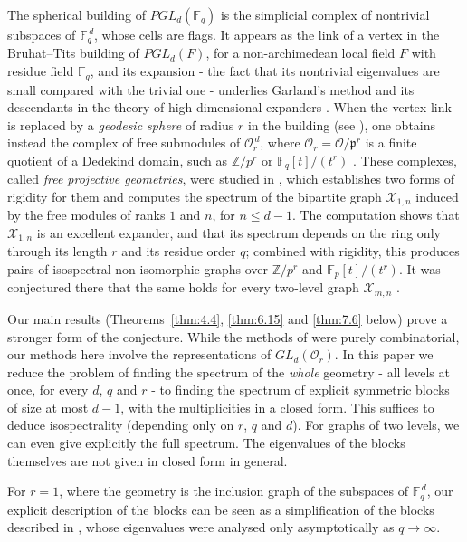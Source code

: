 \documentclass[11pt]{article}
\numberwithin{equation}{section}
\theoremstyle{plain}
\theoremstyle{definition}
\begin{document}
The spherical building of $PGL_d(\mathbb{F}_q)$ is the simplicial complex of
nontrivial subspaces of $\mathbb{F}_q^{\,d}$, whose cells are flags. It appears as the
link of a vertex in the Bruhat--Tits building of $PGL_d(F)$, for a
non-archimedean local field $F$ with residue field $\mathbb{F}_q$, and its
expansion - the fact that its nontrivial eigenvalues are small compared with the
trivial one - underlies Garland's method and its descendants in the theory of
high-dimensional expanders \cite{Gar73,Opp18}. When the vertex link is replaced by
a \emph{geodesic sphere} of radius $r$ in the building (see \cite{KP22}), one obtains instead the complex of
free submodules of $\mathcal{O}_r^{\,d}$, where $\mathcal{O}_r=\mathcal{O}/\mathfrak{p}^r$
is a finite quotient of a Dedekind domain, such as $\mathbb{Z}/p^r$ or
$\mathbb{F}_q[t]/(t^r)$ \cite{KP22}. These complexes, called \emph{free projective
geometries}, were studied in \cite{LP25}, which establishes two forms of rigidity for them and
computes the spectrum of the bipartite graph $\mathcal{X}_{1,n}$ induced by the free
modules of ranks $1$ and $n$, for $n\le d-1$. The computation shows that $\mathcal{X}_{1,n}$ is an
excellent expander, and that its spectrum depends on the ring only through its length
$r$ and its residue order $q$; combined with rigidity, this produces pairs of isospectral
non-isomorphic graphs over $\mathbb{Z}/p^r$ and $\mathbb{F}_p[t]/(t^r)$. It was
conjectured there that the same holds for every two-level graph $\mathcal{X}_{m,n}$
\cite[Conj. 6.2]{LP25}.

Our main results (Theorems~\ref{thm:4.4}, \ref{thm:6.15} and \ref{thm:7.6} below) prove a
stronger form of the conjecture. While the methods of \cite{LP25} were purely combinatorial,
our methods here involve the representations of $GL_d(\mathcal{O}_r)$.
In this paper we reduce the problem of finding the spectrum of the \emph{whole} geometry - all levels at once,
for every $d$, $q$ and $r$ - to finding the spectrum of explicit symmetric blocks of size
at most $d-1$, with the multiplicities in a closed form. This suffices to deduce isospectrality
(depending only on $r$, $q$ and $d$). For graphs of two levels, we can even give
explicitly the full spectrum. The eigenvalues of the blocks
themselves are not given in closed form in general.

For $r=1$, where
the geometry is the inclusion graph of the subspaces of
$\mathbb{F}_q^{\,d}$, our explicit description of the blocks can be seen as a simplification of the blocks described in \cite{Lew24}, whose eigenvalues
were analysed only asymptotically as $q\to\infty$.
\end{document}
